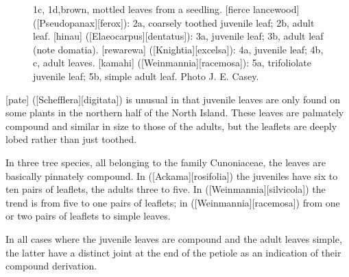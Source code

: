 \begin{figure}[!b]
\begin{minipage}[t]{\textwidth}
\begin{minipage}[t]{(\textwidth-\fgap) * \real{0.474}}
{			1c, 1d,brown, mottled leaves from a seedling.
			[fierce lancewood] ([Pseudopanax][ferox]):
			2a, coarsely toothed juvenile leaf;
			2b, adult leaf.
			[hinau] ([Elaeocarpus][dentatus]):
			3a, juvenile leaf;
			3b, adult leaf (note domatia).
			[rewarewa] ([Knightia][excelsa]):
			4a, juvenile leaf;
			4b, c, adult leaves.
			 ([Weinmannia][racemosa]):
			5a, trifoliolate juvenile leaf;
			5b, simple adult leaf.
			Photo  J. E. Casey.}%
			\label{fig:19leaves}
		\end{minipage}
	\end{minipage}
\end{figure}

[pate] ([Schefflera][digitata]) is unusual in that juvenile leaves are only found on some plants in the northern half of the North Island.
These leaves are palmately compound and similar in size to those of the adults, but the leaflets are deeply lobed rather than just toothed.

In three tree species, all belonging to the family Cunoniaceae, the leaves are basically pinnately compound.
In  ([Ackama][rosifolia]) the juveniles have six to ten pairs of leaflets, the adults three to five.
In  ([Weinmannia][silvicola]) the trend is from five to one pairs of leaflets; in  ([Weinmannia][racemosa]) from one or two pairs of leaflets to simple leaves.

In all cases where the juvenile leaves are compound and the adult leaves simple, the latter have a distinct joint at the end of the petiole as an indication of their compound derivation.

